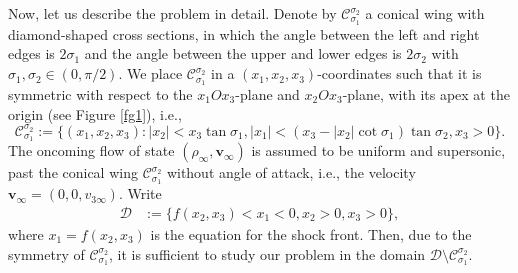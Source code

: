 \documentclass[reqno,12pt]{amsart}
\numberwithin{equation}{section}
\begin{document}
Now, let us describe the problem in detail. Denote by $\mathcal{C}_{\sigma_1}^{\sigma_2}$ a conical wing with diamond-shaped cross sections, in which the angle between the left and right edges is $2\sigma_1$ and the angle between the upper and lower edges is $2\sigma_2$ with $\sigma_1,\sigma_2\in(0,\pi/2)$. We place $\mathcal{C}_{\sigma_1}^{\sigma_2}$ in a $(x_1,x_2,x_3)$-coordinates such that it is symmetric with respect to the $x_{1}Ox_{3}$-plane and $x_{2}Ox_{3}$-plane, with its apex at the origin (see Figure \ref{fg1}), i.e.,
\begin{equation}\label{eq:conical body}
	\mathcal{C}_{\sigma_1}^{\sigma_2}:=\{(x_1,x_2,x_3):|x_{2}|<x_{3}\tan\sigma_1, |x_{1}|<(x_3-|x_2|\cot\sigma_1)\tan\sigma_2,x_{3}>0\}.
\end{equation}
The oncoming flow of state $(\rho_{\infty},\bm{v}_{\infty})$ is assumed to be uniform and supersonic, past the conical wing $\mathcal{C}_{\sigma_1}^{\sigma_2}$ without angle of attack, i.e., the velocity $\bm{v}_{\infty}=(0,0,v_{3\infty})$. Write
\begin{align*}
	\mathcal{D}&:=\{f(x_{2},x_{3})<x_{1}<0,x_{2}>0,x_{3}>0\},
\end{align*}
where $x_1=f(x_{2},x_{3})$ is the equation for the shock front. Then, due to the symmetry of $\mathcal{C}_{\sigma_1}^{\sigma_2}$, it is sufficient to study our problem in the domain $\mathcal{D}\setminus \mathcal{C}_{\sigma_1}^{\sigma_2}$.
\end{document}
